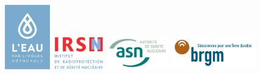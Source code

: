 \documentclass{article}
\begin{document}
\begin{center}
\vspace{0.5 cm}
\includegraphics[height = 80pt ]{logoeaulimoges.png}
\hspace{0.3em}
\includegraphics[height = 40pt ]{logoIRSN.png} 
\hspace{0.3em}
\includegraphics[height = 40pt]{logo_ASN.png}
\hspace{0.3em}
\includegraphics[height = 40pt]{logo_BRGM.png}

\end{center}


\newpage
{}
\tableofcontents

\newpage
\end{document}
